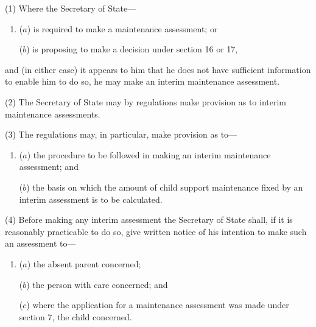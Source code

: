 \documentclass[12pt,a4paper]{article}
\begin{document}
%
%
%
%
%

(1) Where the Secretary of State—
\begin{enumerate}\item[]
($a$) is required to make a maintenance assessment; or

($b$) is proposing to make a decision under section 16 or 17,
\end{enumerate}
and (in either case) it appears to him that he does not have sufficient information to enable him to do so, he may make an interim maintenance assessment.

(2) The Secretary of State may by regulations make provision as to interim maintenance assessments.

(3) The regulations may, in particular, make provision as to—
\begin{enumerate}\item[]
($a$) the procedure to be followed in making an interim maintenance assessment; and

($b$) the basis on which the amount of child support maintenance fixed by an interim assessment is to be calculated.
\end{enumerate}

(4) Before making any interim assessment 
the Secretary of State  %
shall, if it is reasonably practicable to do so, give written notice of his intention to make such an assessment to—
\begin{enumerate}\item[]
($a$) the absent parent concerned;

($b$) the person with care concerned; and

($c$) where the application for a maintenance assessment was made under section 7, the child concerned.
\end{enumerate}
\end{document}
